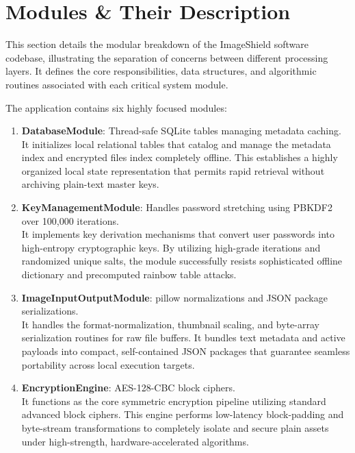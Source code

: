 \documentclass[12pt,a4paper]{report}
\begin{document}
\section{Modules \& Their Description}
This section details the modular breakdown of the ImageShield software codebase, illustrating the separation of concerns between different processing layers. It defines the core responsibilities, data structures, and algorithmic routines associated with each critical system module.

The application contains six highly focused modules:
\begin{enumerate}
    \item \textbf{DatabaseModule}: Thread-safe SQLite tables managing metadata caching. \\
    It initializes local relational tables that catalog and manage the metadata index and encrypted files index completely offline. This establishes a highly organized local state representation that permits rapid retrieval without archiving plain-text master keys.
    
    \item \textbf{KeyManagementModule}: Handles password stretching using PBKDF2 over 100,000 iterations. \\
    It implements key derivation mechanisms that convert user passwords into high-entropy cryptographic keys. By utilizing high-grade iterations and randomized unique salts, the module successfully resists sophisticated offline dictionary and precomputed rainbow table attacks.
    
    \item \textbf{ImageInputOutputModule}: pillow normalizations and JSON package serializations. \\
    It handles the format-normalization, thumbnail scaling, and byte-array serialization routines for raw file buffers. It bundles text metadata and active payloads into compact, self-contained JSON packages that guarantee seamless portability across local execution targets.
    
    \item \textbf{EncryptionEngine}: AES-128-CBC block ciphers. \\
    It functions as the core symmetric encryption pipeline utilizing standard advanced block ciphers. This engine performs low-latency block-padding and byte-stream transformations to completely isolate and secure plain assets under high-strength, hardware-accelerated algorithms.
    

\end{enumerate}
\end{document}
